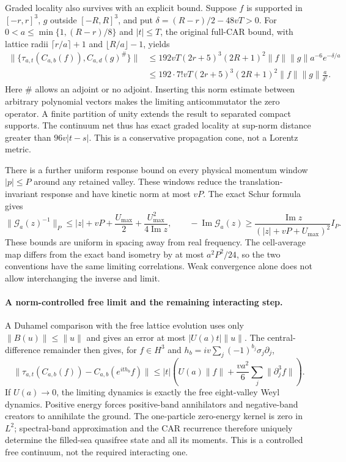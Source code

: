 Graded locality also survives with an explicit bound.  Suppose $f$ is
supported in $[-r,r]^3$, $g$ outside $[-R,R]^3$, and put
$\delta=(R-r)/2-48vT>0$.  For
$0<a\leq\min\{1,(R-r)/8\}$ and $|t|\leq T$, the original full-CAR
bound, with lattice radii $\lceil r/a\rceil+1$ and
$\lfloor R/a\rfloor-1$, yields
\begin{align*}
 \|\{\tau_{a,t}(C_{a,b}(f)),C_{a,d}(g)^\#\}\|
 &\leq192vT(2r+5)^3(2R+1)^2\|f\|\|g\|
                          a^{-6}e^{-\delta/a}\\
 &\leq192\cdot7!vT(2r+5)^3(2R+1)^2\|f\|\|g\|
                          \frac{a}{\delta^7}.
\end{align*}
Here $\#$ allows an adjoint or no adjoint.
Inserting this norm estimate between arbitrary polynomial vectors makes
the limiting anticommutator the zero operator.  A finite partition of
unity extends the result to separated compact supports.  The continuum
net thus has exact graded locality at sup-norm distance greater than
$96v|t-s|$.  This is a conservative propagation cone, not a Lorentz metric.

There is a further uniform response bound on every physical momentum
window $|p|\leq P$ around any retained valley.  These windows reduce the
translation-invariant response and have kinetic norm at most $vP$.
The exact Schur formula gives
\[
 \|\mathcal G_a(z)^{-1}\|_{P}
 \leq |z|+vP+\frac{U_{\max}}2
                   +\frac{U_{\max}^2}{4\operatorname{Im}z},
 \qquad
 -\operatorname{Im}\mathcal G_a(z)
 \geq\frac{\operatorname{Im}z}{(|z|+vP+U_{\max})^2}I_P.
\]
These bounds are uniform in spacing away from real frequency.  The
cell-average map differs from the exact band isometry by at most
$a^2P^2/24$, so the two conventions have the same limiting correlations.
Weak convergence alone does not allow interchanging the inverse and limit.

\paragraph{A norm-controlled free limit and the remaining interacting step.}
A Duhamel comparison with the free lattice evolution uses only
$\|B(u)\|\leq\|u\|$ and gives an error at most $|U(a)t|\|u\|$.
The central-difference remainder then gives, for $f\in H^3$ and
$h_b=iv\sum_j(-1)^{b_j}\sigma_j\partial_j$,
\[
 \|\tau_{a,t}(C_{a,b}(f))-C_{a,b}(e^{it h_b}f)\|
 \leq|t|\left(U(a)\|f\|
             +\frac{va^2}{6}\sum_j\|\partial_j^3f\|\right).
\]
If $U(a)\to0$, the limiting dynamics is exactly the free eight-valley
Weyl dynamics.  Positive energy forces positive-band annihilators and
negative-band creators to annihilate the ground.  The one-particle
zero-energy kernel is zero in $L^2$; spectral-band approximation and the
CAR recurrence therefore uniquely determine the filled-sea quasifree
state and all its moments.  This is a controlled free continuum, not the
required interacting one.

